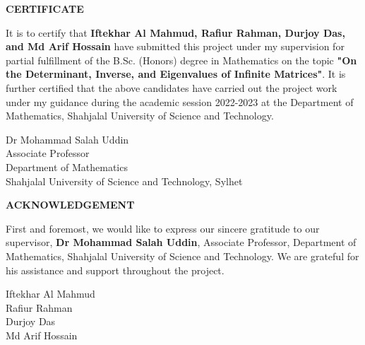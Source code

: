\begin{center}
    \Large \textbf{CERTIFICATE}
\end{center}
\vspace{0.50cm}
It is to certify that \textbf{Iftekhar Al Mahmud, Rafiur Rahman, Durjoy Das, and Md Arif Hossain} have submitted this project under my supervision for partial fulfillment of the B.Sc. (Honors) degree in Mathematics on the topic \textbf{"On the Determinant, Inverse, and Eigenvalues of Infinite Matrices"}. It is further certified that the above candidates have carried out the project work under my guidance during the academic session 2022-2023 at the Department of Mathematics, Shahjalal University of Science and Technology.

\vspace{4cm}
\begin{flushright}
    \Large {Dr Mohammad Salah Uddin} \\
    Associate Professor \\
    Department of Mathematics \\
    Shahjalal University of Science and Technology, Sylhet
\end{flushright}

\newpage

\begin{center}
    \LARGE \textbf{ACKNOWLEDGEMENT}
\end{center}
\vspace{1cm}
First and foremost, we would like to express our sincere gratitude to our supervisor, \textbf{Dr Mohammad Salah Uddin}, Associate Professor, Department of Mathematics, Shahjalal University of Science and Technology. \newline
We are grateful for his assistance and support throughout the project.


\vspace{1cm}

\begin{flushright}
    \large Iftekhar Al Mahmud \\
    Rafiur Rahman \\
    Durjoy Das \\
    Md Arif Hossain
\end{flushright}